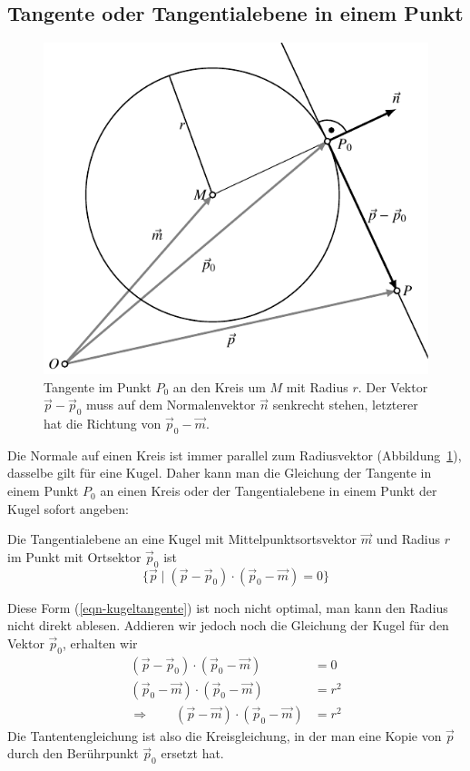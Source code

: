 %
%
\subsection{Tangente oder Tangentialebene in einem Punkt}
\begin{figure}
\centering
\includegraphics{4/images/tangente.pdf}
\caption{Tangente im Punkt $P_0$ an den Kreis um $M$ mit Radius $r$.
Der Vektor $\vec{p}-\vec{p}_0$ muss auf dem
Normalenvektor $\vec{n}$ senkrecht stehen, letzterer hat die Richtung
von $
\vec{p}_0-\vec{m}$.
\label{tangente-graphik}}
\end{figure}
Die Normale auf einen Kreis ist immer parallel zum Radiusvektor
(Abbildung~\ref{tangente-graphik}),
dasselbe gilt für eine Kugel.
Daher kann
man die Gleichung der Tangente in einem Punkt $P_0$ an einen Kreis
oder der Tangentialebene in einem Punkt der Kugel sofort angeben:
\begin{satz}\label{kugeltangentialebene}
Die Tangentialebene an eine Kugel mit Mittelpunktsortsvektor
$\vec m$ und Radius  $r$ im Punkt mit Ortsektor $\vec p_0$ ist
\begin{equation}
\{\vec p\;|\;
(\vec p-\vec p_0)\cdot(\vec p_0-\vec m)=0
\}
\label{eqn-kugeltangente}
\end{equation}
\end{satz}
Diese Form (\ref{eqn-kugeltangente}) ist noch nicht optimal, man kann den
Radius nicht direkt ablesen.
Addieren wir jedoch noch die Gleichung
der Kugel für den Vektor $\vec p_0$, erhalten wir
\begin{align*}
(\vec p-\vec p_0)\cdot(\vec p_0-\vec m)&=0\\
(\vec p_0-\vec m)\cdot(\vec p_0-\vec m)&=r^2\\
\Rightarrow\qquad
(\vec p-\vec m)\cdot(\vec p_0-\vec m)&=r^2
\end{align*}
Die Tantentengleichung ist also die Kreisgleichung, in der man
eine Kopie von $\vec p$ durch den Berührpunkt $\vec p_0$ ersetzt
hat.

